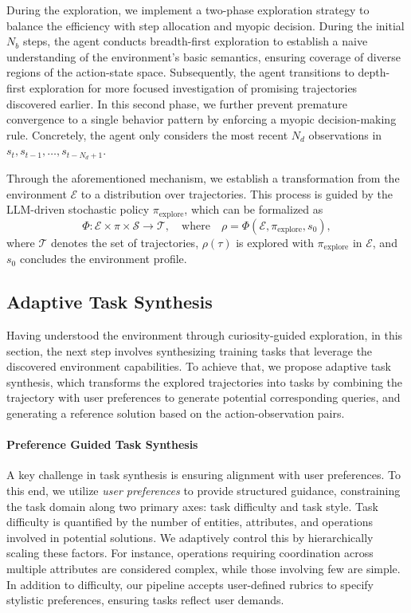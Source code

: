 During the exploration, we implement a two-phase exploration strategy to balance the efficiency with step allocation and myopic decision. During the initial $N_b$ steps, the agent conducts breadth-first exploration to establish a naive understanding of the environment's basic semantics, ensuring coverage of diverse regions of the action-state space. Subsequently, the agent transitions to depth-first exploration for more focused investigation of promising trajectories discovered earlier.
In this second phase, we further prevent premature convergence to a single behavior pattern by enforcing a myopic decision-making rule. Concretely, the agent only considers the most recent $N_d$ observations in $s_{t},s_{t-1},\dots,s_{t-N_d+1}$.

Through the aforementioned mechanism, we establish a transformation from the environment $\mathcal E$ to a distribution over trajectories. This process is guided by the LLM-driven stochastic policy $\pi_{\mathrm{explore}}$, which can be formalized as
\begin{equation}
    \Phi: \mathcal{E}\times\pi\times\mathcal S \to \mathcal{T}, \quad \text{where} \quad \rho = \Phi(\mathcal{E},\pi_\mathrm{explore},s_0),
\end{equation}
where $\mathcal{T}$ denotes the set of trajectories, $\rho(\tau)$ is explored with $\pi_{\mathrm{explore}}$ in $\mathcal E$, and $s_0$ concludes the environment profile.


\subsection{Adaptive Task Synthesis} \label{sec:adaptive-task-synthesis}

Having understood the environment through curiosity-guided exploration, in this section, the next step involves synthesizing training tasks that leverage the discovered environment capabilities. To achieve that, we propose adaptive task synthesis, which transforms the explored trajectories into tasks by combining the trajectory with user preferences to generate potential corresponding queries, and generating a reference solution based on the action-observation pairs.


\paragraph{Preference Guided Task Synthesis}

A key challenge in task synthesis is ensuring alignment with user preferences. To this end, we utilize \textit{user preferences} to provide structured guidance, constraining the task domain along two primary axes: task difficulty and task style.
Task difficulty is quantified by the number of entities, attributes, and operations involved in potential solutions. We adaptively control this by hierarchically scaling these factors. For instance, operations requiring coordination across multiple attributes are considered complex, while those involving few are simple. In addition to difficulty, our pipeline accepts user-defined rubrics to specify stylistic preferences, ensuring tasks reflect user demands.

